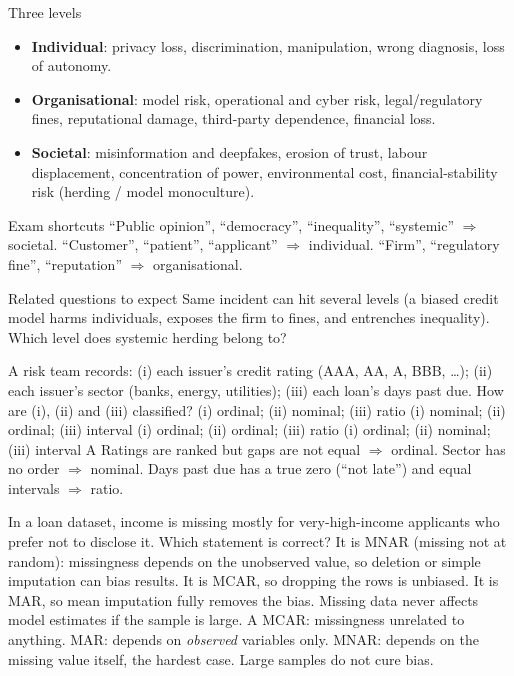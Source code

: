 {\begin{block}{Three levels}
		\begin{itemize}
			\item \textbf{Individual}: privacy loss, discrimination, manipulation, wrong diagnosis, loss of autonomy.
			\item \textbf{Organisational}: model risk, operational and cyber risk, legal/regulatory fines, reputational damage, third-party dependence, financial loss.
			\item \textbf{Societal}: misinformation and deepfakes, erosion of trust, labour displacement, concentration of power, environmental cost, financial-stability risk (herding / model monoculture).
\end{itemize}\end{block}}
{\begin{block}{Exam shortcuts}
		``Public opinion'', ``democracy'', ``inequality'', ``systemic'' $\Rightarrow$ societal. ``Customer'', ``patient'', ``applicant'' $\Rightarrow$ individual. ``Firm'', ``regulatory fine'', ``reputation'' $\Rightarrow$ organisational.
	\end{block}
	\begin{alertblock}{Related questions to expect}
		Same incident can hit several levels (a biased credit model harms individuals, exposes the firm to fines, and entrenches inequality). Which level does systemic herding belong to?
\end{alertblock}}

{A risk team records: (i) each issuer's credit rating (AAA, AA, A, BBB, \ldots); (ii) each issuer's sector (banks, energy, utilities); (iii) each loan's days past due. How are (i), (ii) and (iii) classified?}
{(i) ordinal; (ii) nominal; (iii) ratio}
{(i) nominal; (ii) ordinal; (iii) interval}
{(i) ordinal; (ii) ordinal; (iii) ratio}
{(i) ordinal; (ii) nominal; (iii) interval}
{A}
{Ratings are ranked but gaps are not equal $\Rightarrow$ ordinal. Sector has no order $\Rightarrow$ nominal. Days past due has a true zero (``not late'') and equal intervals $\Rightarrow$ ratio.}

{In a loan dataset, income is missing mostly for very-high-income applicants who prefer not to disclose it. Which statement is correct?}
{It is MNAR (missing not at random): missingness depends on the unobserved value, so deletion or simple imputation can bias results.}
{It is MCAR, so dropping the rows is unbiased.}
{It is MAR, so mean imputation fully removes the bias.}
{Missing data never affects model estimates if the sample is large.}
{A}
{MCAR: missingness unrelated to anything. MAR: depends on \emph{observed} variables only. MNAR: depends on the missing value itself, the hardest case. Large samples do not cure bias.}

